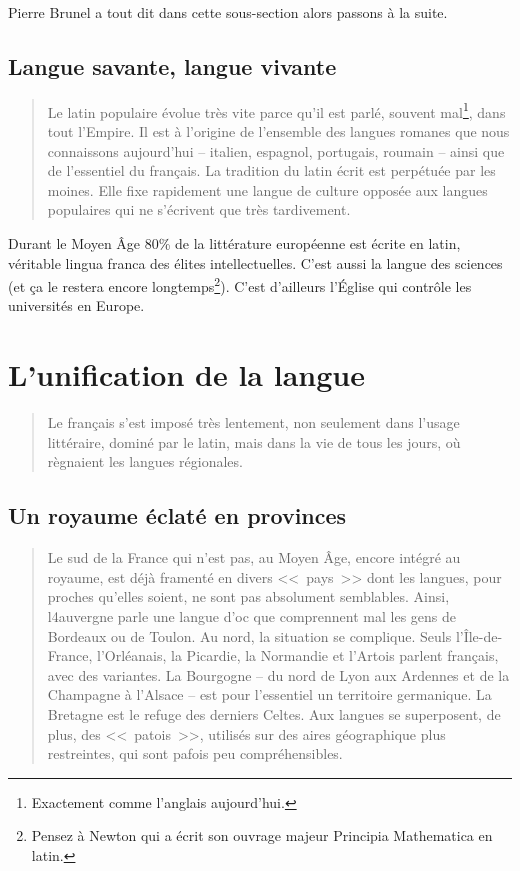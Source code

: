 Pierre Brunel a tout dit dans cette sous-section alors passons à la
suite.

\subsection{Langue savante, langue vivante}\label{subsec:lslv}

\begin{quotation}
  Le latin populaire évolue très vite parce qu'il est parlé, souvent
  mal\footnote{Exactement comme l'anglais aujourd'hui.}, dans tout
  l'Empire. Il est à l'origine de l'ensemble des langues romanes que
  nous connaissons aujourd'hui -- italien, espagnol, portugais,
  roumain -- ainsi que de l'essentiel du français.
  La tradition du latin écrit est perpétuée par les moines. Elle fixe
  rapidement une langue de culture opposée aux langues populaires qui
  ne s'écrivent que très tardivement.
\end{quotation}

Durant le Moyen Âge 80\% de la littérature européenne est écrite en
latin, véritable lingua franca des élites intellectuelles. C'est aussi
la langue des sciences (et ça le restera encore
longtemps\footnote{Pensez à Newton qui a écrit son ouvrage majeur
  Principia Mathematica en latin.}). C'est d'ailleurs l'\'Eglise qui
contrôle les universités en Europe.


\section{L'unification de la langue}\label{sec:unifr}

\begin{quote}
  Le français s'est imposé très lentement, non seulement dans l'usage
  littéraire, dominé par le latin, mais dans la vie de tous les jours,
  où règnaient les langues régionales.
\end{quote}

\subsection{Un royaume éclaté en provinces}\label{subsec:roysplit}

\begin{quotation}
  Le sud de la France qui n'est pas, au Moyen Âge, encore intégré au
  royaume, est déjà framenté en divers <<~pays~>> dont les langues,
  pour proches qu'elles soient, ne sont pas absolument semblables.
  Ainsi, l4auvergne parle une langue d'oc que comprennent mal les gens
  de Bordeaux ou de Toulon.
  Au nord, la situation se complique. Seuls l'Île-de-France,
  l'Orléanais, la Picardie, la Normandie et l'Artois parlent français,
  avec des variantes.
  La Bourgogne -- du nord de Lyon aux Ardennes et de la Champagne à
  l'Alsace -- est pour l'essentiel un territoire germanique.
  La Bretagne est le refuge des derniers Celtes.
  Aux langues se superposent, de plus, des <<~patois~>>, utilisés sur
  des aires géographique plus restreintes, qui sont pafois peu compréhensibles.
\end{quotation}

